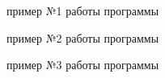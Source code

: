 \documentclass[a4paper,14pt]{extreport}
\begin{document}
\begin{figure}[H]
		\caption{пример №1 работы программы}
		\label{ris:image}
	\end{figure}
\begin{figure}[H]
		\caption{пример №2 работы программы}
		\label{ris:image}
	\end{figure}
\begin{figure}[H]
		\caption{пример №3 работы программы}
		\label{ris:image}
	\end{figure}
\end{document}
